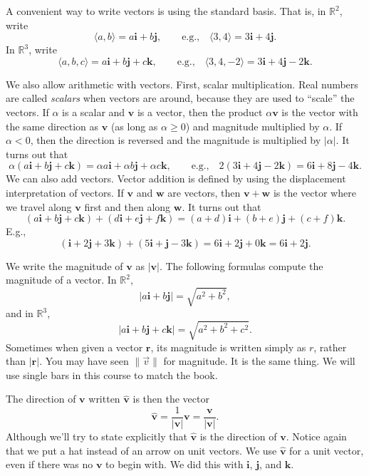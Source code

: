 \documentclass[12pt]{article}
\newcommand{\sabs}[1]{\lvert {#1} \rvert}
\newcommand{\snorm}[1]{\lVert {#1} \rVert}
\newcommand{\R}{{\mathbb{R}}}
\newcommand{\veci}{\mathbf{i}}
\newcommand{\vecj}{\mathbf{j}}
\newcommand{\veck}{\mathbf{k}}
\begin{document}
A convenient way to write vectors is using the standard basis.
That is, in $\R^2$, write
\[
\langle a,b \rangle = a \veci + b \vecj,
\qquad \text{e.g.,} \quad
\langle 3,4 \rangle = 3 \veci + 4 \vecj.
\]
In $\R^3$, write
\[
\langle a,b,c \rangle = a \veci + b \vecj + c \veck,
\qquad \text{e.g.,} \quad
\langle 3,4,-2 \rangle = 3 \veci + 4 \vecj - 2 \veck.
\]

We also allow arithmetic with vectors.
First, scalar multiplication.
Real numbers are called \emph{scalars} when vectors are around,
because they are used to ``scale'' the vectors.
If $\alpha$ is a scalar and $\mathbf{v}$
is a vector, then the product $\alpha\mathbf{v}$ is the vector with the same direction as
$\mathbf{v}$ (as long as $\alpha \geq 0$) and magnitude multiplied by $\alpha$.
If $\alpha < 0$, then the direction is reversed and the magnitude is multiplied by
$\sabs{\alpha}$.
It turns out that
\[
\alpha ( a \veci + b \vecj + c \veck ) =
\alpha a \veci + \alpha b \vecj + \alpha c \veck,
\qquad \text{e.g.,} \quad
2 ( 3 \veci + 4 \vecj - 2 \veck ) =
6 \veci + 8 \vecj - 4 \veck
.
\]
We can also add vectors.
Vector addition is defined by using the displacement interpretation of vectors.
If $\mathbf{v}$ and $\mathbf{w}$ are vectors,
then $\mathbf{v}+\mathbf{w}$ is the vector where we travel along $\mathbf{v}$ first
and then along $\mathbf{w}$.
It turns out that
\[
( a \veci + b \vecj + c \veck ) +
( d \veci + e \vecj + f \veck ) =
(a+d) \veci + (b+e) \vecj + (c+f) \veck .
\]
E.g.,
\[
( \veci + 2 \vecj + 3 \veck ) +
( 5 \veci + \vecj - 3 \veck ) =
6 \veci + 2 \vecj + 0 \veck = 6 \veci + 2 \vecj
.
\]

We write the magnitude of $\mathbf{v}$ as
$\sabs{\mathbf{v}}$.
The following formulas compute the magnitude of a vector.
In $\R^2$,
\[
\sabs{a \veci + b \vecj}
=
\sqrt{a^2+b^2} ,
\]
and in $\R^3$,
\[
\sabs{a \veci + b \vecj + c \veck}
=
\sqrt{a^2+b^2+c^2} .
\]
Sometimes when given a vector $\mathbf{r}$, its magnitude is written simply as
$r$, rather than $\sabs{\mathbf{r}}$.
You may have seen $\snorm{\vec{v}}$ for magnitude. 
It is the same thing.
We will use single bars in this course to
match the book.

The direction of $\mathbf{v}$ written $\hat{\mathbf{v}}$ is then
the vector
\[
\hat{\mathbf{v}} = \frac{1}{\sabs{\mathbf{v}}} \mathbf{v} = \frac{\mathbf{v}}{\sabs{\mathbf{v}}} .
\]
Although we'll try to state explicitly that $\hat{\mathbf{v}}$  is the direction of $\mathbf{v}$.
Notice again that we put a hat instead of an arrow on unit vectors.
We use $\hat{\mathbf{v}}$ for a unit vector, even if there was no
$\mathbf{v}$ to begin with.  We did this with $\veci$, $\vecj$, and $\veck$.
\end{document}
